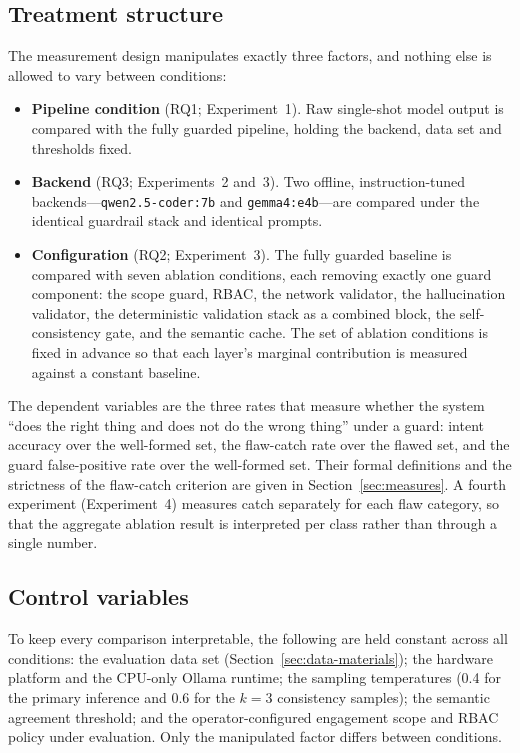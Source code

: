 \subsection*{Treatment structure}

The measurement design manipulates exactly three factors, and nothing else is
allowed to vary between conditions:
\begin{itemize}
\item \textbf{Pipeline condition} (RQ1; Experiment~1). Raw single-shot model
output is compared with the fully guarded pipeline, holding the backend, data set
and thresholds fixed.
\item \textbf{Backend} (RQ3; Experiments~2 and~3). Two offline,
instruction-tuned backends---\texttt{qwen2.5-coder:7b} and
\texttt{gemma4:e4b}---are compared under the identical guardrail stack and
identical prompts.
\item \textbf{Configuration} (RQ2; Experiment~3). The fully guarded baseline is
compared with seven ablation conditions, each removing exactly one guard
component: the scope guard, RBAC, the network validator, the hallucination
validator, the deterministic validation stack as a combined block, the
self-consistency gate, and the semantic cache. The set of ablation conditions is
fixed in advance so that each layer's marginal contribution is measured against a
constant baseline.
\end{itemize}

The dependent variables are the three rates that measure whether the system
``does the right thing and does not do the wrong thing'' under a guard: intent
accuracy over the well-formed set, the flaw-catch rate over the flawed set, and
the guard false-positive rate over the well-formed set. Their formal definitions
and the strictness of the flaw-catch criterion are given in
Section~\ref{sec:measures}. A fourth experiment (Experiment~4) measures catch
separately for each flaw category, so that the aggregate ablation result is
interpreted per class rather than through a single number.

\subsection*{Control variables}

To keep every comparison interpretable, the following are held constant across
all conditions: the evaluation data set (Section~\ref{sec:data-materials}); the
hardware platform and the CPU-only Ollama runtime; the sampling temperatures
(0.4 for the primary inference and 0.6 for the $k=3$ consistency samples); the
semantic agreement threshold; and the operator-configured engagement scope and
RBAC policy under evaluation. Only the manipulated factor differs between
conditions.

